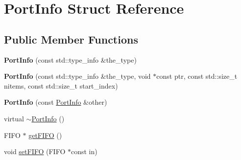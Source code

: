 \hypertarget{struct_port_info}{}\section{Port\+Info Struct Reference}
\label{struct_port_info}
\subsection*{Public Member Functions}
\begin{DoxyCompactItemize}
\item 
\hypertarget{struct_port_info_ada6f27ee68c0d489ad5a8ef41a990628}{}{\bfseries Port\+Info} (const std\+::type\+\_\+info \&the\+\_\+type)\label{struct_port_info_ada6f27ee68c0d489ad5a8ef41a990628}

\item 
\hypertarget{struct_port_info_a8a74d623dea1deab1d26920ece808dff}{}{\bfseries Port\+Info} (const std\+::type\+\_\+info \&the\+\_\+type, void $\ast$const ptr, const std\+::size\+\_\+t nitems, const std\+::size\+\_\+t start\+\_\+index)\label{struct_port_info_a8a74d623dea1deab1d26920ece808dff}

\item 
\hypertarget{struct_port_info_a8756457c158ca06d189b08b4b8fe3a12}{}{\bfseries Port\+Info} (const \hyperlink{struct_port_info}{Port\+Info} \&other)\label{struct_port_info_a8756457c158ca06d189b08b4b8fe3a12}

\item 
virtual \hyperlink{struct_port_info_a36e5aca1b7b20aace809490cebbc2d72}{$\sim$\+Port\+Info} ()
\item 
F\+I\+F\+O $\ast$ \hyperlink{struct_port_info_a483d162fbe356e07381c6c5cfccb4f48}{get\+F\+I\+F\+O} ()
\item 
void \hyperlink{struct_port_info_a43a57cd624dcc44ccd9dcaba1d07a000}{set\+F\+I\+F\+O} (F\+I\+F\+O $\ast$const in)
\end{DoxyCompactItemize}
